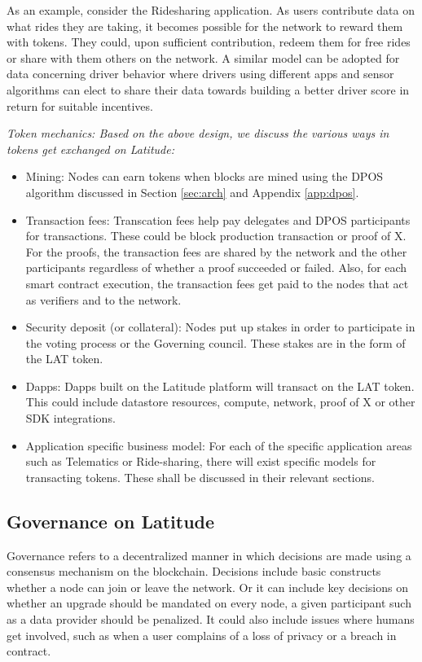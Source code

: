 As an example, consider the Ridesharing application. As users contribute data on what rides they are taking, it becomes
possible for the network to reward them with tokens. They could, upon sufficient contribution, redeem them for free
rides or share with them others on the network. A similar model can be adopted for data concerning driver behavior where
drivers using different apps and sensor algorithms can elect to share their data towards building a better driver score
in return for suitable incentives.

\noindent
{\em Token mechanics: Based on the above design, we discuss the various ways in tokens get exchanged on Latitude:}
\begin{itemize}
    \item Mining: Nodes can earn tokens when blocks are mined using the DPOS algorithm discussed in Section
        \ref{sec:arch} and Appendix \ref{app:dpos}.
    \item Transaction fees: Transcation fees help pay delegates and DPOS participants for transactions. These could be
        block production transaction or proof of X. For the proofs, the transaction fees are shared by the network and
        the other participants regardless of whether a proof succeeded or failed. Also, for each smart contract
        execution, the transaction fees get paid to the nodes that act as verifiers and to the network.
    \item Security deposit (or collateral): Nodes put up stakes in order to participate in the voting process or the
        Governing council. These stakes are in the form of the LAT token.
    \item Dapps: Dapps built on the Latitude platform will transact on the LAT token. This could include datastore
        resources, compute, network, proof of X or other SDK integrations.
    \item Application specific business model: For each of the specific application areas such as Telematics or
        Ride-sharing, there will exist specific models for transacting tokens. These shall be discussed in their
        relevant sections.
\end{itemize}

\subsection{Governance on Latitude}

Governance refers to a decentralized manner in which decisions are made using a consensus mechanism on the blockchain.
Decisions include basic constructs whether a node can join or leave the network. Or it can include key decisions on
whether an upgrade should be mandated on every node, a given participant such as a data provider should be penalized. It
could also include issues where humans get involved, such as when a user complains of a loss of privacy or a breach in
contract.

